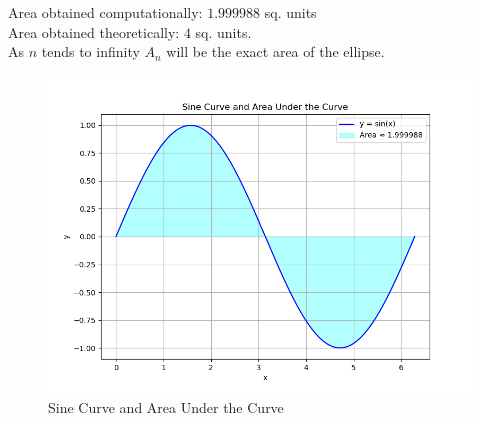 \documentclass[journal]{IEEEtran}
\begin{document}
Area obtained computationally: $1.999988$ sq. units\\
Area obtained theoretically: $4$ sq. units.\\
As $n$ tends to infinity $A_n$ will be the exact area of the ellipse.

\begin{figure}[h!]
    \centering
    \includegraphics[width=\columnwidth]{figs/i.png}
    \caption{Sine Curve and Area Under the Curve}
    \label{fig:sine_curve}
\end{figure}
\end{document}
